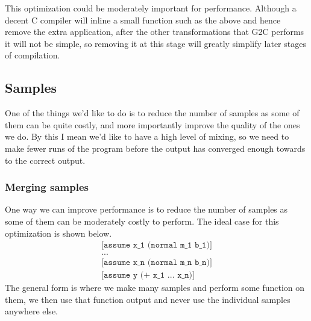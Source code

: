 \documentclass[a4paper]{article}
\begin{document}
This optimization could be moderately important for performance. Although a decent C compiler will inline a small function such as the above and hence remove the extra application, after the other transformations that G2C performs it will not be simple, so removing it at this stage will greatly simplify later stages of compilation.




\subsection{Samples}

One of the things we'd like to do is to reduce the number of samples as some of them can be quite costly, and more importantly improve the quality of the ones we do. By this I mean we'd like to have a high level of mixing, so we need to make fewer runs of the program before the output has converged enough towards to the correct output.




\subsubsection{Merging samples}

One way we can improve performance is to reduce the number of samples as some of them can be moderately costly to perform. The ideal case for this optimization is shown below.
\[
	\begin{array}{l}
		\texttt{[assume x\_1 (normal m\_1 b\_1)]} \\
		\texttt{...} \\
		\texttt{[assume x\_n (normal m\_n b\_n)]} \\
		\texttt{[assume y (+ x\_1 ...\ x\_n)]}
	\end{array}
\]
The general form is where we make many samples and perform some function on them, we then use that function output and never use the individual samples anywhere else.
\end{document}
